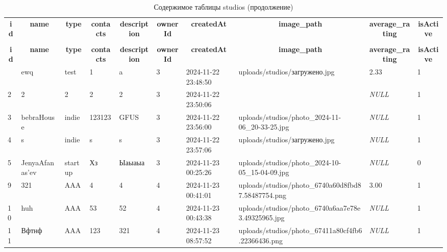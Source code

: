%
%
 \begin{longtable}{|l|l|l|l|l|l|l|l|l|l|} 
 \hline \endhead \hline \endfoot \hline 
 \caption{Содержимое таблицы studios} \label{tab:studios-data} \\\hline \multicolumn{1}{|c|}{\textbf{id}} & \multicolumn{1}{|c|}{\textbf{name}} & \multicolumn{1}{|c|}{\textbf{type}} & \multicolumn{1}{|c|}{\textbf{contacts}} & \multicolumn{1}{|c|}{\textbf{description}} & \multicolumn{1}{|c|}{\textbf{ownerId}} & \multicolumn{1}{|c|}{\textbf{createdAt}} & \multicolumn{1}{|c|}{\textbf{image\_path}} & \multicolumn{1}{|c|}{\textbf{average\_rating}} & \multicolumn{1}{|c|}{\textbf{isActive}} \\ \hline \hline  \endfirsthead 
\caption{Содержимое таблицы studios (продолжение)} \\ \hline \multicolumn{1}{|c|}{\textbf{id}} & \multicolumn{1}{|c|}{\textbf{name}} & \multicolumn{1}{|c|}{\textbf{type}} & \multicolumn{1}{|c|}{\textbf{contacts}} & \multicolumn{1}{|c|}{\textbf{description}} & \multicolumn{1}{|c|}{\textbf{ownerId}} & \multicolumn{1}{|c|}{\textbf{createdAt}} & \multicolumn{1}{|c|}{\textbf{image\_path}} & \multicolumn{1}{|c|}{\textbf{average\_rating}} & \multicolumn{1}{|c|}{\textbf{isActive}} \\ \hline \hline \endhead \endfoot
1 & ewq & test & 1 & a & 3 & 2024-11-22 23:48:50 & uploads/studios/загружено.jpg & 2.33 & 1 \\ \hline 
2 & 2 & 2 & 2 & 2 & 3 & 2024-11-22 23:50:06 &  & \textit{NULL} & 1 \\ \hline 
3 & bebraHouse & indie & 123123 & GFUS & 3 & 2024-11-22 23:56:00 & uploads/studios/photo\_2024-11-06\_20-33-25.jpg & \textit{NULL} & 1 \\ \hline 
4 & s & indie & s & s & 3 & 2024-11-22 23:57:06 & uploads/studios/загружено.jpg & \textit{NULL} & 1 \\ \hline 
5 & JenyaAfanas'ev & startup & Хз & Ыаыаыа & 3 & 2024-11-23 00:25:26 & uploads/studios/photo\_2024-10-05\_15-04-09.jpg & \textit{NULL} & 0 \\ \hline 
9 & 321 & AAA & 4 & 4 & 4 & 2024-11-23 00:41:01 & uploads/studios/photo\_6740a60d8fbd87.58487754.png & 3.00 & 1 \\ \hline 
10 & huh & AAA & 53 & 52 & 4 & 2024-11-23 00:43:38 & uploads/studios/photo\_6740a6aa7e78e3.49325965.jpg & \textit{NULL} & 1 \\ \hline 
11 & Вфтнф & AAA & 123 & 321 & 4 & 2024-11-23 08:57:52 & uploads/studios/photo\_67411a80cf4fb6.22366436.png & \textit{NULL} & 1 \\ \hline 

\end{longtable}
